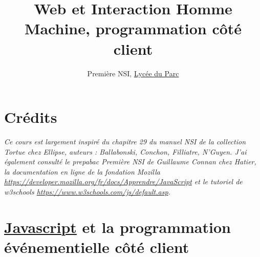 \documentclass[
  11pt,
]{article}
\title{Web et Interaction Homme Machine, programmation côté client}
\author{Première NSI, \href{https://frederic-junier.org/}{Lycée du
Parc}}
\date{}
\newcounter{exo}
\newcounter{def}
\newcounter{cours}
\newcounter{prog}
\begin{document}
\maketitle

\renewcommand*\contentsname{Table des matières}
{
\hypersetup{linkcolor=}
\setcounter{tocdepth}{3}
\tableofcontents
}
\hypertarget{cruxe9dits}{%
\section*{Crédits}\label{cruxe9dits}}

\emph{Ce cours est largement inspiré du chapitre 29 du manuel NSI de la
collection Tortue chez Ellipse, auteurs : Ballabonski, Conchon,
Filliatre, N'Guyen. J'ai également consulté le prepabac Première NSI de
Guillaume Connan chez Hatier, la documentation en ligne de la fondation
Mozilla \url{https://developer.mozilla.org/fr/docs/Apprendre/JavaScript}
et le tutoriel de w3schools
\url{https://www.w3schools.com/js/default.asp}.}

\hypertarget{javascriptjavascript-et-la-programmation-uxe9vuxe9nementielle-cuxf4tuxe9-client}{%
\section{\texorpdfstring{\href{https://developer.mozilla.org/fr/docs/Glossaire/JavaScript}{Javascript}
et la programmation événementielle côté
client}{Javascript et la programmation événementielle côté client}}\label{javascriptjavascript-et-la-programmation-uxe9vuxe9nementielle-cuxf4tuxe9-client}}
\end{document}

